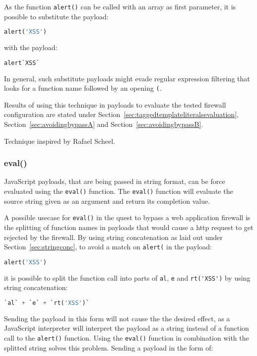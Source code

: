 As the function \verb|alert()| can be called with an array as first parameter, it is possible to substitute the payload:
\begin{lstlisting}[style=basicStyle,language=Python]
alert('XSS')
\end{lstlisting}
with the payload:

\begin{lstlisting}[style=basicStyle,language=Python]
alert`XSS`
\end{lstlisting}
In general, such substitute payloads might evade regular expression filtering that looks for a function name followed by an opening \verb|(|.

Results of using this technique in payloads to evaluate the tested firewall configuration are stated under Section~\ref{sec:taggedtemplateliteralsevaluation}, Section~\ref{sec:avoidingbypassA} and Section~\ref{sec:avoidingbypassB}.

Technique inspired by Rafael Scheel. \cite{onecons/wafbypass}

\subsubsection{eval()}
\label{sec:eval}

JavaScript payloads, that are being passed in string format, can be force evaluated using the \verb|eval()| function. The \verb|eval()| function will evaluate the source string given as an argument and return its completion value. \cite{js/eval}

A possible usecase for \verb|eval()| in the quest to bypass a web application firewall is the splitting of function names in payloads that would cause a \acrshort{http} request to get rejected by the firewall. By using string concatenation as laid out under Section~\ref{sec:stringconc}, to avoid a match on \verb|alert(| in the payload:

\begin{lstlisting}[style=basicStyle,language=Python]
alert('XSS')
\end{lstlisting}
it is possible to split the function call into parts of \verb|al|, \verb|e| and \verb|rt('XSS')| by using string concatenation:

\begin{lstlisting}[style=basicStyle,language=Python]
`al` + `e` + `rt('XSS')`
\end{lstlisting}
Sending the payload in this form will not cause the the desired effect, as a JavaScript interpreter will interpret the payload as a string instead of a function call to the \verb|alert()| function.
Using the \verb|eval()| function in combination with the splitted string solves this problem. Sending a payload in the form of:

